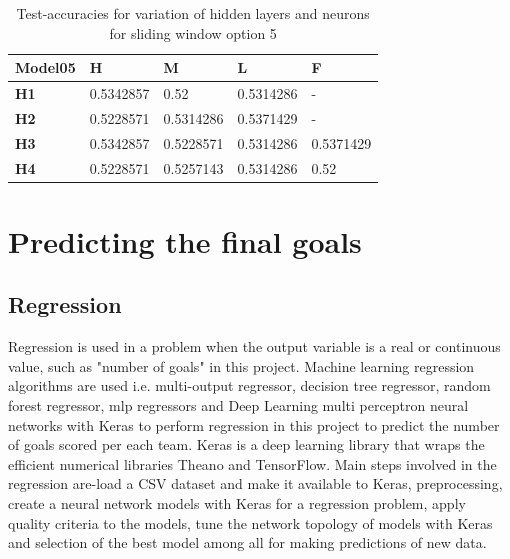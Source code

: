 \begin{table}
\centering
\begin{tabular}{|l|l|l|l|l|}
\hline

\textbf{Model05} & \textbf{H} & \textbf{M} & \textbf{L} & \textbf{F} \\ \hline
\textbf{H1} & 0.5342857 & 0.52 & 0.5314286 & - \\ \hline
\textbf{H2} & 0.5228571 & 0.5314286 & 0.5371429 & - \\ \hline
\textbf{H3} & 0.5342857 & 0.5228571 & 0.5314286 & 0.5371429 \\ \hline
\textbf{H4} & 0.5228571 & 0.5257143 & 0.5314286 & 0.52 \\ \hline

\end{tabular}
\caption{Test-accuracies for variation of hidden layers and neurons for sliding window option 5}
\label{table:nn_variation_sliding_05}
\end{table}

\section{Predicting the final goals}
\subsection{Regression}
Regression is used in a problem when the output variable is a real or continuous value, such as "number of goals" in this project. Machine learning regression algorithms are used i.e. multi-output regressor, decision tree regressor, random forest regressor, mlp regressors and Deep Learning multi perceptron neural networks with Keras to perform regression in this project to predict the number of goals scored per each team. Keras is a deep learning library that wraps the efficient numerical libraries Theano and TensorFlow. Main steps involved in the regression are-load a CSV dataset and make it available to Keras, preprocessing, create a neural network models with Keras for a regression problem, apply quality criteria to the models, tune the network topology of models with Keras and selection of the best model among all for making predictions of new data. 
